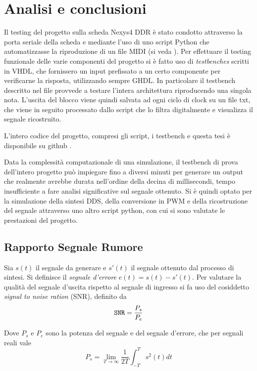\chapter{Analisi e conclusioni}
Il testing del progetto sulla scheda Nexys4 DDR è stato condotto
attraverso la porta seriale della scheda e mediante l'uso di uno
script Python che automatizzasse la riproduzione di un file MIDI 
(si veda ).
Per effettuare il testing funzionale delle varie componenti del progetto
si è fatto uso di \textit{testbenches} scritti in VHDL, che fornissero
un input prefissato a un certo componente per verificarne la risposta,
utilizzando sempre GHDL.
In particolare il testbench descritto nel file
  provvede a testare l'intera
architettura riproducendo una singola nota.
L'uscita del blocco  viene quindi salvata ad ogni
ciclo di clock su un file txt, che viene in seguito processato
dallo script  che lo filtra
digitalmente e visualizza il segnale ricostruito.

L'intero codice del progetto, compresi gli script, i testbench e questa
tesi è disponibile su github \cite{sourcecode}.

Data la complessità computazionale di una simulazione, il testbench
di prova dell'intero progetto può impiegare fino a diversi minuti
per generare un output che realmente avrebbe durata nell'ordine della
decina di millisecondi, tempo insufficiente a fare analisi significative
sul segnale ottenuto.
Si è quindi optato per la simulazione della sintesi DDS, della conversione
in PWM e della ricostruzione del segnale attraverso uno altro script python,
con cui si sono valutate le prestazioni del progetto.

\section{Rapporto Segnale Rumore}
Sia $s(t)$ il segnale da generare e $s'(t)$ il segnale ottenuto
dal processo di sintesi.
Si definisce il \textit{segnale d'errore} $e(t)=s(t)-s'(t)$.
Per valutare la qualità del segnale d'uscita rispetto al segnale di ingresso
si fa uso del cosiddetto \textit{signal to noise ration} (SNR), definito da\cite{tlc}
\begin{equation}
\texttt{SNR} = \frac{P_s}{P_e}
\end{equation}

Dove $P_s$ e $P_e$ sono la potenza del segnale e del segnale d'errore, che per segnali
reali vale \cite{oppenheim}
\begin{equation}
P_s = \lim_{T\to\infty} \frac{1}{2T}\int_{-T}^{T} s^2(t) dt 
\end{equation}

